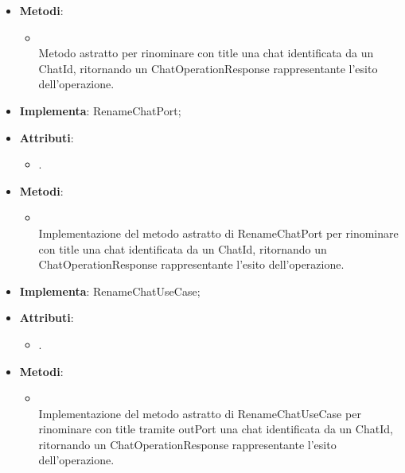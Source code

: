 \documentclass[10pt, a4paper]{article}
\begin{document}
\label{RenameChatPortDettaglio}
\begin{itemize}
    \item \textbf{Metodi}:
    \begin{itemize}
        \item {}\\
        Metodo astratto per rinominare con title una chat identificata da un ChatId, ritornando un ChatOperationResponse rappresentante l'esito dell'operazione.
    \end{itemize}
\end{itemize}

\label{RenameChatPostgresDettaglio}
\begin{itemize}
    \item \textbf{Implementa}: RenameChatPort;
    \item \textbf{Attributi}:
    \begin{itemize}
        \item {}.
    \end{itemize}
    \item \textbf{Metodi}:
    \begin{itemize}
        \item {}\\
        Implementazione del metodo astratto di RenameChatPort per rinominare con title una chat identificata da un ChatId, ritornando un ChatOperationResponse rappresentante l'esito dell'operazione.
    \end{itemize}
\end{itemize}



\label{RenameChatServiceDettaglio}
\begin{itemize}
    \item \textbf{Implementa}: RenameChatUseCase;
    \item \textbf{Attributi}:
    \begin{itemize}
        \item {}.
    \end{itemize}
    \item \textbf{Metodi}:
    \begin{itemize}
        \item {}\\
        Implementazione del metodo astratto di RenameChatUseCase per rinominare con title tramite outPort una chat identificata da un ChatId, ritornando un ChatOperationResponse rappresentante l'esito dell'operazione.
    \end{itemize}
\end{itemize}
\end{document}
